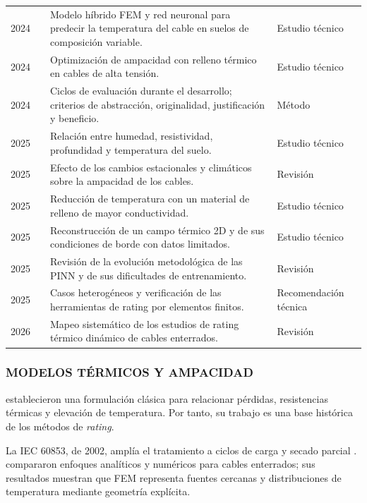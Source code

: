 \begin{longtable}{L{1.1cm}L{3.4cm}L{7.6cm}L{2.4cm}}
2024 & \textcite{aldulaimi2024} & Modelo híbrido FEM y red neuronal para predecir la temperatura del cable en suelos de composición variable. & Estudio técnico \\
2024 & \textcite{atoccsa2024} & Optimización de ampacidad con relleno térmico en cables de alta tensión. & Estudio técnico \\
2024 & \textcite{delport2024} & Ciclos de evaluación durante el desarrollo; criterios de abstracción, originalidad, justificación y beneficio. & Método \\
2025 & \textcite{khumalo2025} & Relación entre humedad, resistividad, profundidad y temperatura del suelo. & Estudio técnico \\
2025 & \textcite{mobius2025} & Efecto de los cambios estacionales y climáticos sobre la ampacidad de los cables. & Revisión \\
2025 & \textcite{kim2025} & Reducción de temperatura con un material de relleno de mayor conductividad. & Estudio técnico \\
2025 & \textcite{pan2025} & Reconstrucción de un campo térmico 2D y de sus condiciones de borde con datos limitados. & Estudio técnico \\
2025 & \textcite{ren2025} & Revisión de la evolución metodológica de las PINN y de sus dificultades de entrenamiento. & Revisión \\
2025 & \textcite{cigre2025} & Casos heterogéneos y verificación de las herramientas de rating por elementos finitos. & Recomendación técnica \\
2026 & \textcite{fariz2026} & Mapeo sistemático de los estudios de rating térmico dinámico de cables enterrados. & Revisión \\
\bottomrule
\end{longtable}\endgroup

\subsubsection{MODELOS TÉRMICOS Y AMPACIDAD}

\textcite[752--772]{neher1957} establecieron una formulación clásica para relacionar pérdidas, resistencias térmicas y elevación de temperatura. Por tanto, su trabajo es una base histórica de los métodos de \textit{rating}.

La IEC 60853, de 2002, amplía el tratamiento a ciclos de carga y secado parcial \parencite[cláusulas 2--4]{iec60853}. \textcite[1387--1400]{aras2005} compararon enfoques analíticos y numéricos para cables enterrados; sus resultados muestran que FEM representa fuentes cercanas y distribuciones de temperatura mediante geometría explícita.

